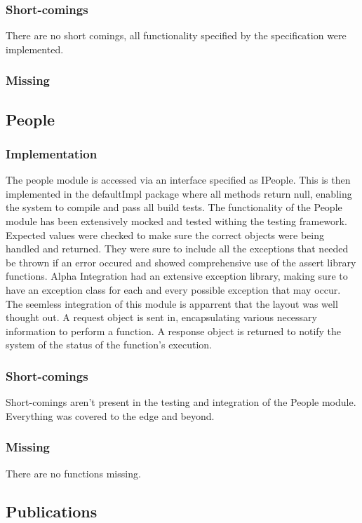 \documentclass{article}
\begin{document}
        \subsubsection{Short-comings}
        There are no short comings, all functionality specified by the specification were implemented.
        \subsubsection{Missing}
        
    \subsection{People}
        \subsubsection{Implementation}
        The people module is accessed via an interface specified as IPeople. This is then implemented in the defaultImpl package where all methods return null, enabling the system to compile and pass all build tests. The functionality of the People module has been extensively mocked and tested withing the testing framework. Expected values were checked to make sure the correct objects were being handled and returned. They were sure to include all the exceptions that needed be thrown if an error occured and showed comprehensive use of the assert library functions. Alpha Integration had an extensive exception library, making sure to have an exception class for each and every possible exception that may occur. The seemless integration of this module is apparrent that the layout was well thought out. A request object is sent in, encapsulating various necessary information to perform a function. A response object is returned to notify the system of the status of the function's execution.
        \subsubsection{Short-comings}
        Short-comings aren't present in the testing and integration of the People module. Everything was covered to the edge and beyond.
        \subsubsection{Missing}
        There are no functions missing.
        
    \subsection{Publications}
\end{document}
